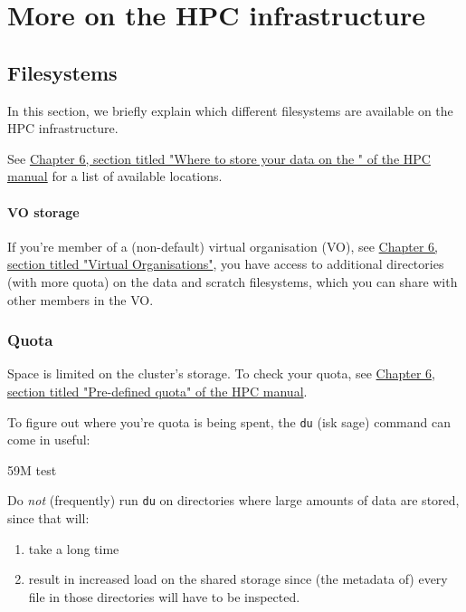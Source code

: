\chapter{More on the HPC infrastructure}

\section{Filesystems}

In this section, we briefly explain which different filesystems are available on
the \gls{HPC} infrastructure.

See \href{\HPCManualURL#predefined-user-directories}{Chapter 6, section titled "Where to store your data on the \hpc{}" of the HPC manual}
for a list of available locations.

\ifgent

\subsubsection{VO storage}

If you're member of a (non-default) virtual organisation (VO), see
\href{\HPCManualURL#sec:virtual-organisation}{Chapter 6, section titled "Virtual Organisations"}, you have access to
additional directories (with more quota) on the data and \gls{scratch} filesystems,
which you can share with other members in the VO.

\fi

\subsection{Quota}

Space is limited on the cluster's storage. To check your quota, see
\href{\HPCManualURL#predefined-quotas}{Chapter 6, section titled "Pre-defined quota" of the HPC manual}.

To figure out where you're quota is being spent, the \lstinline|du| (isk sage)
command can come in useful:

\begin{prompt}
59M   test
\end{prompt}

Do \emph{not} (frequently) run \lstinline|du| on directories where large amounts
of data are stored, since that will:
\begin{enumerate}
    \item take a long time
    \item result in increased
        load on the shared storage since (the metadata of) every file in those directories
        will have to be inspected.
\end{enumerate}


